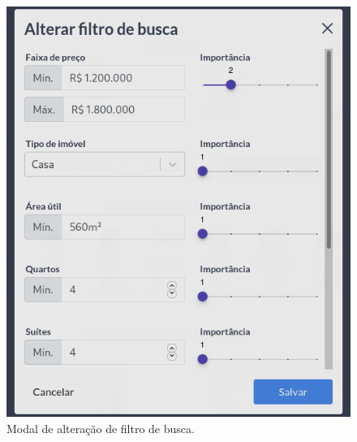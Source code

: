 \begin{figure}[H]
    \centering
    \includegraphics[scale=0.45]{figuras/desenvolvimento/componente_filtro3.png}
    \caption[Modal de alteração de filtro de busca]{Modal de alteração de filtro de busca.}
    \label{fig:componente_filtro3}
\end{figure}

